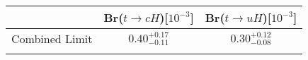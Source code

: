 
\centering
\begin{tabular}{ccc} \toprule\toprule
 & Br($t\to cH$)[$10^{-3}$] & Br($t\to uH$)[$10^{-3}$]\\\midrule
Combined Limit & $0.40^{+0.17}_{-0.11}$ & $0.30^{+0.12}_{-0.08}$\\
\bottomrule\bottomrule\\
\end{tabular}